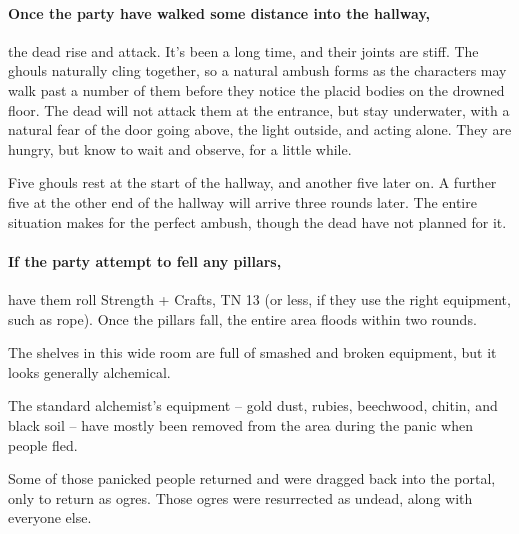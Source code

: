 \begin{multicols}{2}
\begin{exampletext}
\end{exampletext}

\paragraph{Once the party have walked some distance into the hallway,}
the dead rise and attack.
It's been a long time, and their joints are stiff.
The ghouls naturally cling together, so a natural ambush forms as the characters may walk past a number of them before they notice the placid bodies on the drowned floor.
The dead will not attack them at the entrance, but stay underwater, with a natural fear of the door going above, the light outside, and acting alone.
They are hungry, but know to wait and observe, for a little while.

Five ghouls rest at the start of the hallway, and another five later on.
A further five at the other end of the hallway will arrive three rounds later.
The entire situation makes for the perfect ambush, though the dead have not planned for it.


\paragraph{If the party attempt to fell any pillars,}
have them roll Strength + Crafts, TN 13 (or less, if they use the right equipment, such as rope).
Once the pillars fall, the entire area floods within two rounds.


\begin{boxtext}

	The shelves in this wide room are full of smashed and broken equipment, but it looks generally alchemical.

\end{boxtext}

\begin{exampletext}

The standard alchemist's equipment -- gold dust, rubies, beechwood, chitin, and black soil -- have mostly been removed from the area during the panic when people fled.

Some of those panicked people returned and were dragged back into the portal, only to return as ogres.  Those ogres were resurrected as undead, along with everyone else.

\end{exampletext}


\end{multicols}
